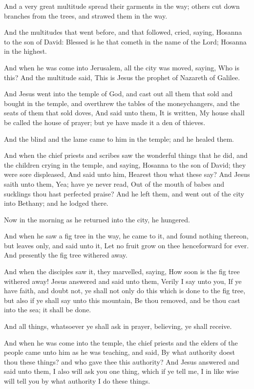 \verse And a very great multitude spread their garments in the way; others cut down branches from the trees, and strawed them in the way.

\verse And the multitudes that went before, and that followed, cried, saying, Hosanna to the son of David: Blessed is he that cometh in the name of the Lord; Hosanna in the highest.

\verse And when he was come into Jerusalem, all the city was moved, saying, Who is this?  \verse And the multitude said, This is Jesus the prophet of Nazareth of Galilee.

\verse And Jesus went into the temple of God, and cast out all them that sold and bought in the temple, and overthrew the tables of the moneychangers, and the seats of them that sold doves, \verse And said unto them, It is written, My house shall be called the house of prayer; but ye have made it a den of thieves.

\verse And the blind and the lame came to him in the temple; and he healed them.

\verse And when the chief priests and scribes saw the wonderful things that he did, and the children crying in the temple, and saying, Hosanna to the son of David; they were sore displeased, \verse And said unto him, Hearest thou what these say? And Jesus saith unto them, Yea; have ye never read, Out of the mouth of babes and sucklings thou hast perfected praise?  \verse And he left them, and went out of the city into Bethany; and he lodged there.

\verse Now in the morning as he returned into the city, he hungered.

\verse And when he saw a fig tree in the way, he came to it, and found nothing thereon, but leaves only, and said unto it, Let no fruit grow on thee henceforward for ever. And presently the fig tree withered away.

\verse And when the disciples saw it, they marvelled, saying, How soon is the fig tree withered away!  \verse Jesus answered and said unto them, Verily I say unto you, If ye have faith, and doubt not, ye shall not only do this which is done to the fig tree, but also if ye shall say unto this mountain, Be thou removed, and be thou cast into the sea; it shall be done.

\verse And all things, whatsoever ye shall ask in prayer, believing, ye shall receive.

\verse And when he was come into the temple, the chief priests and the elders of the people came unto him as he was teaching, and said, By what authority doest thou these things? and who gave thee this authority?  \verse And Jesus answered and said unto them, I also will ask you one thing, which if ye tell me, I in like wise will tell you by what authority I do these things.

